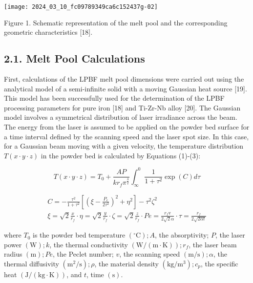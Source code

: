 \documentclass[10pt]{article}
\begin{document}
\begin{center}
\texttt{[image: 2024\_03\_10\_fc09789349ca6c152437g-02]}
\end{center}

Figure 1. Schematic representation of the melt pool and the corresponding geometric characteristics [18].

\subsection*{2.1. Melt Pool Calculations}
First, calculations of the LPBF melt pool dimensions were carried out using the analytical model of a semi-infinite solid with a moving Gaussian heat source [19]. This model has been successfully used for the determination of the LPBF processing parameters for pure iron [18] and Ti-Zr-Nb alloy [20]. The Gaussian model involves a symmetrical distribution of laser irradiance across the beam. The energy from the laser is assumed to be applied on the powder bed surface for a time interval defined by the scanning speed and the laser spot size. In this case, for a Gaussian beam moving with a given velocity, the temperature distribution $T(x \cdot y \cdot z)$ in the powder bed is calculated by Equations (1)-(3):


\begin{equation*}
T(x \cdot y \cdot z)=T_{0}+\frac{A P}{k r_{f} \pi^{\frac{3}{2}}} \int_{\infty}^{0} \frac{1}{1+\tau^{2}} \exp (C) d \tau \tag{1}
\end{equation*}



\begin{gather*}
C=-\frac{\tau^{2}}{1+\tau^{2}}\left[\left(\xi-\frac{P_{e}}{2 \tau^{2}}\right)^{2}+\eta^{2}\right]-\tau^{2} \zeta^{2}  \tag{2}\\
\xi=\sqrt{2} \frac{x}{r_{f}} \cdot \eta=\sqrt{2} \frac{y}{r_{f}} \cdot \zeta=\sqrt{2} \frac{z}{r_{f}} \cdot P e=\frac{r_{f} \mathrm{v}}{2 \sqrt{2} \alpha} \cdot \tau=\frac{r_{f}}{2 \sqrt{2 \alpha t}} \tag{3}
\end{gather*}


where $T_{0}$ is the powder bed temperature $\left({ }^{\circ} \mathrm{C}\right) ; A$, the absorptivity; $P$, the laser power $(\mathrm{W}) ; k$, the thermal conductivity $(\mathrm{W} /(\mathrm{m} \cdot \mathrm{K})) ; r_{f}$, the laser beam radius $(\mathrm{m}) ; P e$, the Peclet number; $v$, the scanning speed $(\mathrm{m} / \mathrm{s}) ; \alpha$, the thermal diffusivity $\left(\mathrm{m}^{2} / \mathrm{s}\right) ; \rho$, the material density $\left(\mathrm{kg} / \mathrm{m}^{3}\right) ; c_{p}$, the specific heat $(\mathrm{J} /(\mathrm{kg} \cdot \mathrm{K}))$, and $t$, time $(\mathrm{s})$.
\end{document}
